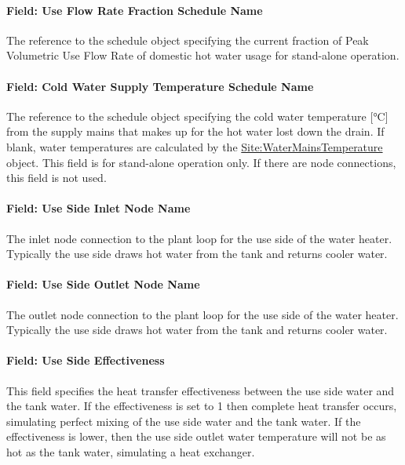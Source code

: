 \paragraph{Field: Use Flow Rate Fraction Schedule Name}\label{field-use-flow-rate-fraction-schedule-name}

The reference to the schedule object specifying the current fraction of Peak Volumetric Use Flow Rate of domestic hot water usage for stand-alone operation.

\paragraph{Field: Cold Water Supply Temperature Schedule Name}\label{field-cold-water-supply-temperature-schedule-name}

The reference to the schedule object specifying the cold water temperature {[}°C{]} from the supply mains that makes up for the hot water lost down the drain. If blank, water temperatures are calculated by the \hyperref[sitewatermainstemperature]{Site:WaterMainsTemperature} object. This field is for stand-alone operation only. If there are node connections, this field is not used.

\paragraph{Field: Use Side Inlet Node Name}\label{field-use-side-inlet-node-name-000}

The inlet node connection to the plant loop for the use side of the water heater. Typically the use side draws hot water from the tank and returns cooler water.

\paragraph{Field: Use Side Outlet Node Name}\label{field-use-side-outlet-node-name-000}

The outlet node connection to the plant loop for the use side of the water heater. Typically the use side draws hot water from the tank and returns cooler water.

\paragraph{Field: Use Side Effectiveness}\label{field-use-side-effectiveness}

This field specifies the heat transfer effectiveness between the use side water and the tank water. If the effectiveness is set to 1 then complete heat transfer occurs, simulating perfect mixing of the use side water and the tank water. If the effectiveness is lower, then the use side outlet water temperature will not be as hot as the tank water, simulating a heat exchanger.

